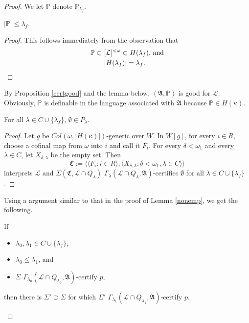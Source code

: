 \documentclass[12pt]{article}
\numberwithin{equation}{section}
\begin{document}
\begin{proof}
We let $\mathbb{P}$ denote $\mathbb{P}_{\lambda_f}$. 

\begin{lem}\label{size}
$|\mathbb{P}| \leq \lambda_f$.
\end{lem}

\begin{proof}
This follows immediately from the observation that 
\begin{align*}
    \mathbb{P} \subset \ & [\mathcal{L}]^{<\omega} \subset H(\lambda_f) \text{, and} \\
    & |H(\lambda_f)| = \lambda_f \text{.} \qedhere
\end{align*}
\end{proof}

By Proposition \ref{certgood} and the lemma below, $(\mathfrak{A}, \mathbb{P})$ is good for $\mathcal{L}$. Obviously, $\mathbb{P}$ is definable in the language associated with $\mathfrak{A}$ because $\mathbb{P} \in H(\kappa)$.

\begin{lem}\label{nonemp}
For all $\lambda \in C \cup \{\lambda_f\}$, $\emptyset \in P_{\lambda}$.
\end{lem}

\begin{proof}
Let $g$ be $Col(\omega, |H(\kappa)|)$-generic over $W$. In $W[g]$, for every $i \in R$, choose a cofinal map from $\omega$ into $i$ and call it $F_i$. For every $\delta < \omega_1$ and every $\lambda \in C$, let $X_{\delta, \lambda}$ be the empty set. Then $$\mathfrak{C} := \langle \langle F_i : i \in R \rangle, \langle X_{\delta, \lambda} : \delta < \omega_1, \lambda \in C \rangle \rangle$$ interprets $\mathcal{L}$ and $\Sigma(\mathfrak{C}, \mathcal{L} \cap Q_{\lambda})$ $\Gamma_{\lambda} (\mathcal{L} \cap Q_{\lambda}, \mathfrak{A})$-certifies $\emptyset$ for all $\lambda \in C \cup \{\lambda_f\}$.  
\end{proof}

Using a argument similar to that in the proof of Lemma \ref{nonemp}, we get the following.

\begin{lem}\label{extcert}
If 
\begin{itemize}
    \item $\lambda_0, \lambda_1 \in C \cup \{\lambda_f\}$, 
    \item $\lambda_0 \leq \lambda_1$, and 
    \item $\Sigma$ $\Gamma_{\lambda_0} (\mathcal{L} \cap Q_{\lambda_0}, \mathfrak{A})$-certify $p$, 
\end{itemize}
then there is $\Sigma' \supset \Sigma$ for which $\Sigma'$ $\Gamma_{\lambda_1} (\mathcal{L} \cap Q_{\lambda_1}, \mathfrak{A})$-certify $p$.
\end{lem}


\end{proof}
\end{document}
